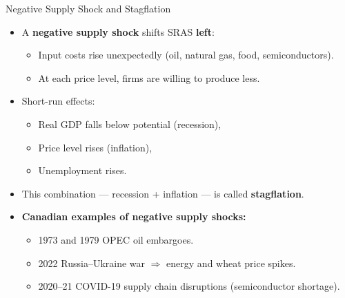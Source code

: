 \documentclass[aspectratio=169]{beamer}
\begin{document}
\begin{frame}{Negative Supply Shock and Stagflation}
\transfade
\begin{itemize}[<+->]
  \item A \textbf{negative supply shock} shifts SRAS \textbf{left}:
  \begin{itemize}[<+->]
    \item Input costs rise unexpectedly (oil, natural gas, food, semiconductors).
    \item At each price level, firms are willing to produce less.
  \end{itemize}
  \item Short-run effects:
  \begin{itemize}[<+->]
    \item Real GDP falls below potential (recession),
    \item Price level rises (inflation),
    \item Unemployment rises.
  \end{itemize}
  \item This combination --- recession + inflation --- is called \textbf{stagflation}.
  \item \textbf{Canadian examples of negative supply shocks:}
  \begin{itemize}[<+->]
    \item 1973 and 1979 OPEC oil embargoes.
    \item 2022 Russia--Ukraine war $\Rightarrow$ energy and wheat price spikes.
    \item 2020--21 COVID-19 supply chain disruptions (semiconductor shortage).
  \end{itemize}
\end{itemize}
\end{frame}
\end{document}

